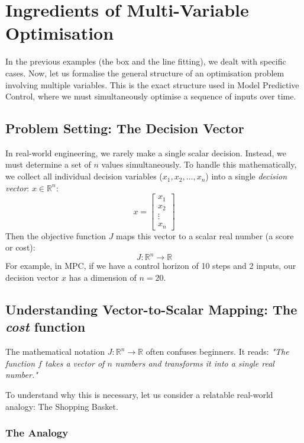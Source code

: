 \section{Ingredients of Multi-Variable Optimisation}

In the previous examples (the box and the line fitting), we dealt with specific cases. Now, let us formalise the general structure of an optimisation problem involving multiple variables. This is the exact structure used in Model Predictive Control, where we must simultaneously optimise a sequence of inputs over time.

\subsection{Problem Setting: The Decision Vector}

In real-world engineering, we rarely make a single scalar decision. Instead, we must determine a set of $n$ values simultaneously. To handle this mathematically, we collect all individual decision variables ($x_1, x_2, \dots, x_n$) into a single \emph{decision vector}: $x \in \mathbb{R}^n$:
\begin{equation}
	x = \begin{bmatrix} x_1 \\ x_2 \\ \vdots \\ x_n \end{bmatrix}
\end{equation}
Then the objective function $J$ maps this vector to a scalar real number (a score or cost):
\[ J: \mathbb{R}^n \to \mathbb{R} \]
For example, in MPC, if we have a control horizon of 10 steps and 2 inputs, our decision vector $x$ has a dimension of $n=20$.

\subsection{Understanding Vector-to-Scalar Mapping: The \emph{cost} function}

The mathematical notation $J: \mathbb{R}^n \to \mathbb{R}$ often confuses beginners. It reads: \textit{"The function $f$ takes a vector of $n$ numbers and transforms it into a single real number."}

To understand why this is necessary, let us consider a relatable real-world analogy: The Shopping Basket.

\subsubsection*{The Analogy}

